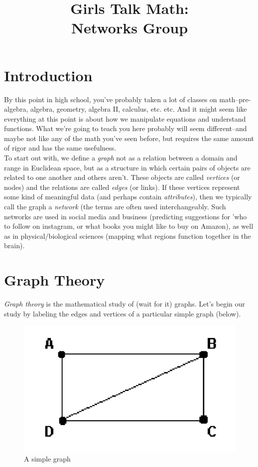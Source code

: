 \documentclass[12pt]{article}
\title{Girls Talk Math: \\Networks Group}
\author{}
\date{}
\begin{document}
\maketitle

\section{Introduction}
By this point in high school, you've probably taken a lot of classes on math--pre-algebra, algebra, geometry, algebra II, calculus, etc. etc. And it might seem like everything at this point is about how we manipulate equations and understand functions. What we're going to teach you here probably will seem different--and maybe not like any of the math you've seen before, but requires the same amount of rigor and has the same usefulness. 
\\
To start out with, we define a \emph{graph} not as a relation between a domain and range in Euclidean space, but as a structure in which certain pairs of objects are related to one another and others aren't. These objects are called \emph{vertices} (or nodes) and the relations are called \emph{edges} (or links). If these vertices represent some kind of meaningful data (and perhaps contain \emph{attributes}), then we typically call the graph a \emph{network} (the terms are often used interchangeably. Such networks are used in social media and business (predicting suggestions for 'who to follow on instagram, or what books you might like to buy on Amazon), as well as in physical/biological sciences (mapping what regions function together in the brain).
\section{Graph Theory}
\emph{Graph theory} is the mathematical study of (wait for it) graphs. Let's begin our study by labeling the edges and vertices of a particular simple graph (below).

\begin{figure}[htbp]
\begin{center}
\includegraphics[width=.25\linewidth]{abcd.png}
\caption{A simple graph}
\label{default}
\end{center}
\end{figure}
\end{document}
